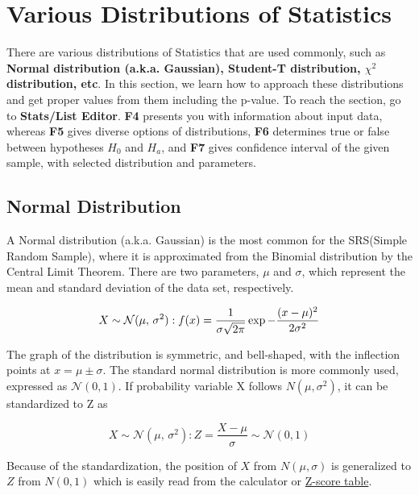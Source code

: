 \section{Various Distributions of Statistics}
    There are various distributions of Statistics that are used commonly, such as \textbf{Normal distribution (a.k.a. Gaussian), Student-T distribution, $\chi^2$ distribution, etc}. In this section, we learn how to approach these distributions and get proper values from them including the p-value. To reach the section, go to \textbf{Stats/List Editor}. \textbf{F4} presents you with information about input data, whereas \textbf{F5} gives diverse options of distributions, \textbf{F6} determines true or false between hypotheses $H_0$ and $H_a$, and \textbf{F7} gives confidence interval of the given sample, with selected distribution and parameters.

\subsection{Normal Distribution}
    A Normal distribution (a.k.a. Gaussian) is the most common for the SRS(Simple Random Sample), where it is approximated from the Binomial distribution by the Central Limit Theorem. There are two parameters, $\mu$ and $\sigma$, which represent the mean and standard deviation of the data set, respectively.
    
    \begin{equation}
        X \sim \mathcal{N}(\mu,\,\sigma^{2}) : f(x) = {1\over{\sigma \sqrt{2\pi}}} \exp{-{{(x-\mu)^2}\over{2\sigma^2}}}
        \label{def_Normal_Distribution}
    \end{equation}

    The graph of the distribution is symmetric, and bell-shaped, with the inflection points at $x=\mu \pm \sigma$. The standard normal distribution is more commonly used, expressed as $\mathcal{N}(0, 1)$. If probability variable X follows $N(\mu, \sigma^{2})$, it can be standardized to Z as

    \begin{equation}
        X \sim \mathcal{N}(\mu,\,\sigma^{2}) : Z = \frac{X-\mu}{\sigma} \sim\mathcal{N}(0, 1)
        \label{def_Standard_Normal_Distribution}
    \end{equation}

    Because of the standardization, the position of $X$ from $N(\mu, \sigma)$ is generalized to $Z$ from $N(0, 1)$ which is easily read from the calculator or \href{https://www.z-table.com/}{Z-score table}.
    
